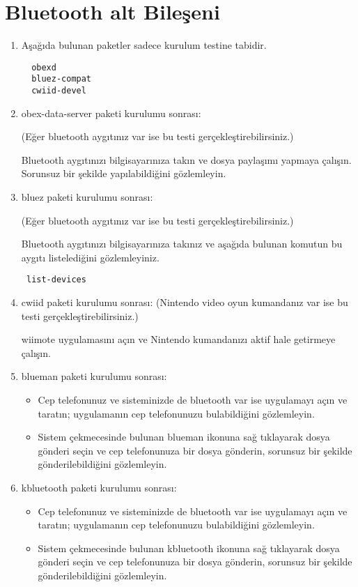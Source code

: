 \documentclass[a4paper,10pt]{article}
\begin{document}
\section{Bluetooth alt Bileşeni}
\begin{enumerate}
\item Aşağıda bulunan paketler sadece kurulum testine tabidir. 
\begin{verbatim}
  obexd
  bluez-compat
  cwiid-devel
\end{verbatim}

 \item obex-data-server paketi kurulumu sonrası: 
 
(Eğer bluetooth aygıtınız var ise bu testi gerçekleştirebilirsiniz.)

Bluetooth aygıtınızı bilgisayarınıza takın ve dosya paylaşımı yapmaya çalışın. Sorunsuz bir şekilde yapılabildiğini gözlemleyin.
 \item bluez paketi kurulumu sonrası: 
 
(Eğer bluetooth aygıtınız var ise bu testi gerçekleştirebilirsiniz.)

Bluetooth aygıtınızı bilgisayarınıza takınız ve aşağıda bulunan komutun bu aygıtı listelediğini gözlemleyiniz.
\begin{verbatim}
 list-devices
\end{verbatim}

 \item cwiid paketi kurulumu sonrası: (Nintendo video oyun kumandanız var ise bu testi gerçekleştirebilirsiniz.)

wiimote uygulamasını açın ve Nintendo kumandanızı aktif hale getirmeye çalışın.

\item blueman paketi kurulumu sonrası:

\begin{itemize}
 \item Cep telefonunuz ve sisteminizde de bluetooth var ise uygulamayı açın ve taratın; uygulamanın cep telefonunuzu bulabildiğini gözlemleyin.

 \item Sistem çekmecesinde bulunan blueman ikonuna sağ tıklayarak dosya gönderi seçin ve cep telefonunuza bir dosya gönderin, sorunsuz bir şekilde gönderilebildiğini gözlemleyin.

\end{itemize}

\item kbluetooth paketi kurulumu sonrası:

\begin{itemize}
 \item Cep telefonunuz ve sisteminizde de bluetooth var ise uygulamayı açın ve taratın; uygulamanın cep telefonunuzu bulabildiğini gözlemleyin.

 \item Sistem çekmecesinde bulunan kbluetooth ikonuna sağ tıklayarak dosya gönderi seçin ve cep telefonunuza bir dosya gönderin, sorunsuz bir şekilde gönderilebildiğini gözlemleyin.

\end{itemize}

\end{enumerate}
\end{document}
